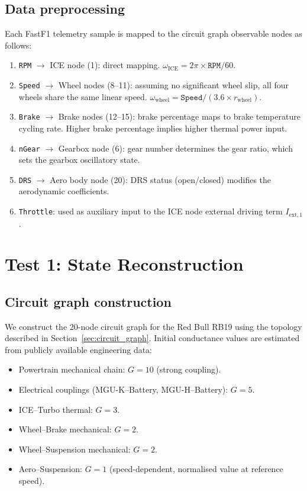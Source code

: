 \documentclass[twocolumn,10pt,a4paper]{article}
\theoremstyle{definition}
\theoremstyle{remark}
\begin{document}
\subsection{Data preprocessing}

Each FastF1 telemetry sample is mapped to the circuit graph observable nodes as follows:
\begin{enumerate}
    \item \texttt{RPM} $\to$ ICE node (1): direct mapping. $\omega_{\mathrm{ICE}} = 2\pi \times \texttt{RPM}/60$.
    \item \texttt{Speed} $\to$ Wheel nodes (8--11): assuming no significant wheel slip, all four wheels share the same linear speed. $\omega_{\mathrm{wheel}} = \texttt{Speed} / (3.6 \times r_{\mathrm{wheel}})$.
    \item \texttt{Brake} $\to$ Brake nodes (12--15): brake percentage maps to brake temperature cycling rate. Higher brake percentage implies higher thermal power input.
    \item \texttt{nGear} $\to$ Gearbox node (6): gear number determines the gear ratio, which sets the gearbox oscillatory state.
    \item \texttt{DRS} $\to$ Aero body node (20): DRS status (open/closed) modifies the aerodynamic coefficients.
    \item \texttt{Throttle}: used as auxiliary input to the ICE node external driving term $I_{\mathrm{ext},1}$.
\end{enumerate}


\section{Test 1: State Reconstruction}\label{sec:test1}

\subsection{Circuit graph construction}

We construct the 20-node circuit graph for the Red Bull RB19 using the topology described in Section~\ref{sec:circuit_graph}. Initial conductance values are estimated from publicly available engineering data:
\begin{itemize}
    \item Powertrain mechanical chain: $G = 10$ (strong coupling).
    \item Electrical couplings (MGU-K--Battery, MGU-H--Battery): $G = 5$.
    \item ICE--Turbo thermal: $G = 3$.
    \item Wheel--Brake mechanical: $G = 2$.
    \item Wheel--Suspension mechanical: $G = 2$.
    \item Aero--Suspension: $G = 1$ (speed-dependent, normalised value at reference speed).
\end{itemize}
\end{document}
